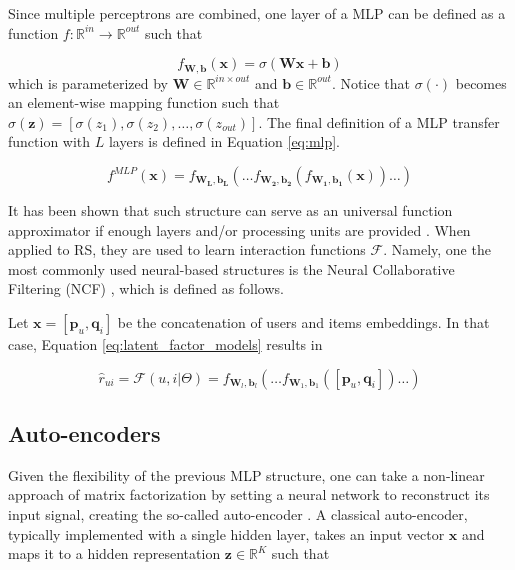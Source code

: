     Since multiple perceptrons are combined, one layer of a MLP can be defined as a function  $f: \mathbb{R}^{in} \rightarrow \mathbb{R}^{out}$ such that 
    
    \begin{equation*}
        f_{\mathbf{W}, \mathbf{b}}(\mathbf{x}) = \sigma(\mathbf{W}\mathbf{x} + \mathbf{b})
        \label{eq:layer}
    \end{equation*} which is parameterized by $\textbf{W} \in \mathbb{R}^{in \times out}$ and $\mathbf{b} \in \mathbb{R}^{out}$. Notice that $\sigma(\cdot)$ becomes an element-wise mapping function such that $\sigma(\mathbf{z}) = [\sigma(z_1), \sigma(z_2), \ldots, \sigma(z_{out})]$. The final definition of a MLP transfer function with $L$ layers is defined in Equation \ref{eq:mlp}.
    
    \begin{equation}
        f^{MLP}(\mathbf{x}) = f_{\mathbf{W_L}, \mathbf{b_L}}(\ldots f_{\mathbf{W_2}, \mathbf{b_2}}(f_{\mathbf{W_1}, \mathbf{b_1}} (\mathbf{x}))\ldots)
        \label{eq:mlp}
    \end{equation}
    
    It has been shown that such structure can serve as an universal function approximator if enough layers and/or processing units are provided \cite{10.5555/521706}. When applied to RS, they are used to learn interaction functions $\mathcal{F}$. Namely, one the most commonly used neural-based structures is the Neural Collaborative Filtering (NCF)  \cite{10.1145/3038912.3052569}, which is defined as follows.
    
    Let $\mathbf{x} = [\mathbf{p}_u, \mathbf{q}_i]$ be the concatenation of users and items embeddings. In that case, Equation \ref{eq:latent_factor_models} results in
    
    \begin{equation*}
        \hat{r}_{ui} = \mathcal{F}(u,i|\Theta) = f_{\mathbf{W}_l, \mathbf{b}_l}(\ldots f_{\mathbf{W}_1, \mathbf{b}_1}([\mathbf{p}_u, \mathbf{q}_i]) \ldots)
    \end{equation*}

    \subsection{Auto-encoders}

    Given the flexibility of the previous MLP structure, one can take a non-linear approach of matrix factorization by setting a neural network to reconstruct its input signal, creating the so-called auto-encoder \cite{10.5555/2976456.2976476}. A classical auto-encoder, typically implemented with a single hidden layer, takes an input vector $\mathbf{x}$ and maps it to a hidden representation $\mathbf{z} \in \mathbb{R}^K$ such that
    
